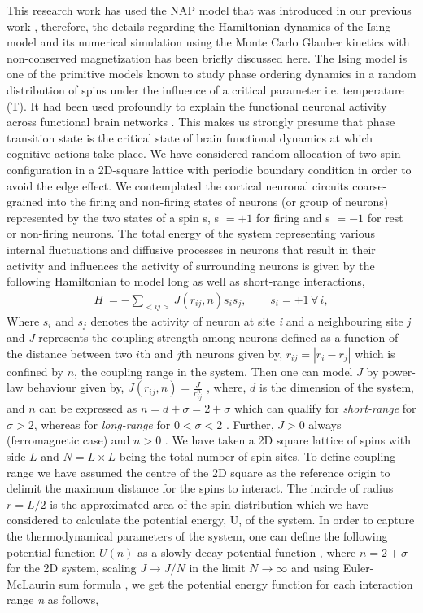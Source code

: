 \documentclass[preprintnumbers,amsmath,amssymb,onecolumn]{revtex4}
\begin{document}
{\noindent}This research work has used the NAP model that was introduced in our previous work \citep{Gundh2015}, therefore, the details regarding the Hamiltonian dynamics of the Ising model and its numerical simulation using the Monte Carlo Glauber kinetics with non-conserved magnetization has been briefly discussed here. The Ising model is one of the primitive models known to study phase ordering dynamics in a random distribution of spins under the influence of a critical parameter i.e. temperature (T). It had been used profoundly to explain the functional neuronal activity across functional brain networks \citep{Fraiman2009,goodarzinick2018}. This makes us strongly presume that phase transition state is the critical state of brain functional dynamics at which cognitive actions take place. We have considered random allocation of two-spin configuration in a 2D-square lattice with periodic boundary condition in order to avoid the edge effect. We contemplated the cortical neuronal circuits coarse-grained into the firing and non-firing states of neurons (or group of neurons) represented by the two states of a spin {s}, {s} $= +1$ for firing and {s} $=-1$ for rest or non-firing neurons. The total energy of the system representing various internal fluctuations and diffusive processes in neurons that result in their activity and influences the activity of surrounding neurons is given by the following Hamiltonian to model long as well as short-range interactions, 
\begin{eqnarray}
\label{2D}
H\:=-{\displaystyle {\displaystyle \sum_{<ij>}{\textstyle J(r_{ij},n)s_{i}s_{j}},}}\;\quad\;\:\;s_{i}=\pm1\,\forall\,i,
\end{eqnarray}
Where $s_{i}$ and $s_{j}$ denotes the activity of neuron at site \textit{i} and a neighbouring site \textit{j} and \textit{J} represents the coupling strength among neurons defined as a function of the distance between two $i$th and $j$th neurons given by, $r_{ij}=|r_i-r_j|$ which is  confined by $n$, the coupling range in the system. Then one can model $J$ by power-law behaviour given by, $J(r_{ij},n) =\frac{J}{r_{ij}^{n}}$ \citep{Cannas1996}, where, $d$ is the dimension of the system, and $n$ can be expressed as $n=d+\sigma=2+\sigma$ \citep{Fisher1972,Blanchard2013} which can qualify for \textit{short-range} for $\sigma>2$, whereas for \textit{long-range} for $0<\sigma<2$ \citep{Picco2012,gruneberg2004}. Further, $J> 0$ always (ferromagnetic case) and $n>0$ \citep{Cannas1996}. We have taken a 2D square lattice of spins with side $L$ and $N=L\times L$ being the total number of spin sites. To define coupling range we have assumed the centre of the 2D square as the reference origin to delimit the maximum distance for the spins to interact. The incircle of radius $r = L/2$ is the approximated area of the spin distribution which we have considered to calculate the potential energy, U, of the system. In order to capture the thermodynamical parameters of the system, one can define the following potential function $U(n)$ as a slowly decay potential function \citep{Chialvo2010,Cannas1996}, where $n =2 + \sigma$ for the 2D system, scaling $J\rightarrow J/N$ in the limit $N\rightarrow\infty$ and using Euler-McLaurin sum formula \citep{bruijn1981}, we get the potential energy function for each interaction range \textit{n} as follows, \citep{Gundh2015}
\end{document}
